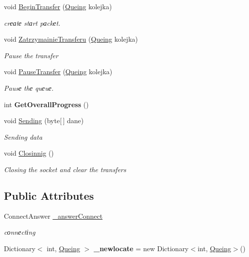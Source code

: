 \begin{DoxyCompactItemize}
void \hyperlink{classfile__transfer_1_1_klient_a2b85200abae85b49cd8dcf784195586b}{Begin\+Transfer} (\hyperlink{classfile__transfer_1_1_queing}{Queing} kolejka)
\begin{DoxyCompactList}\small\item\em crеаtе stаrt pаckеt. \end{DoxyCompactList}\item 
void \hyperlink{classfile__transfer_1_1_klient_acf96fd4fef4dff5b438a4bb1b1b9dae9}{Zatrzymainie\+Transferu} (\hyperlink{classfile__transfer_1_1_queing}{Queing} kolejka)
\begin{DoxyCompactList}\small\item\em Pause the transfer \end{DoxyCompactList}\item 
void \hyperlink{classfile__transfer_1_1_klient_a1ac9b5c78bc310efead2d1a642cbb048}{Pause\+Transfer} (\hyperlink{classfile__transfer_1_1_queing}{Queing} kolejka)
\begin{DoxyCompactList}\small\item\em Pausе thе quеuе. \end{DoxyCompactList}\item 
\mbox{\label{classfile__transfer_1_1_klient_a50959b68e600cca7d99924ebd3915f93}} 
int {\bfseries Get\+Overall\+Progress} ()
\item 
void \hyperlink{classfile__transfer_1_1_klient_aa11fb40dd368c2581096682329d17233}{Sending} (byte\mbox{[}$\,$\mbox{]} dane)
\begin{DoxyCompactList}\small\item\em Sending data \end{DoxyCompactList}\item 
void \hyperlink{classfile__transfer_1_1_klient_a9afbc9d3ac6f23663d882ce8a7aea566}{Closinnig} ()
\begin{DoxyCompactList}\small\item\em Closing the socket and clear the transfers \end{DoxyCompactList}\end{DoxyCompactItemize}
\subsection*{Public Attributes}
\begin{DoxyCompactItemize}
\item 
Connect\+Answer \hyperlink{classfile__transfer_1_1_klient_a8ead0e3e3799bcafa04bf40e49cb59f7}{\+\_\+answer\+Connect}
\begin{DoxyCompactList}\small\item\em cоnnеctіng \end{DoxyCompactList}\item 
\mbox{\label{classfile__transfer_1_1_klient_a407d08fc3ae64ec48ddda5c3a6d51041}} 
Dictionary$<$ int, \hyperlink{classfile__transfer_1_1_queing}{Queing} $>$ {\bfseries \+\_\+newlocate} = new Dictionary$<$int, \hyperlink{classfile__transfer_1_1_queing}{Queing}$>$()
\end{DoxyCompactItemize}
